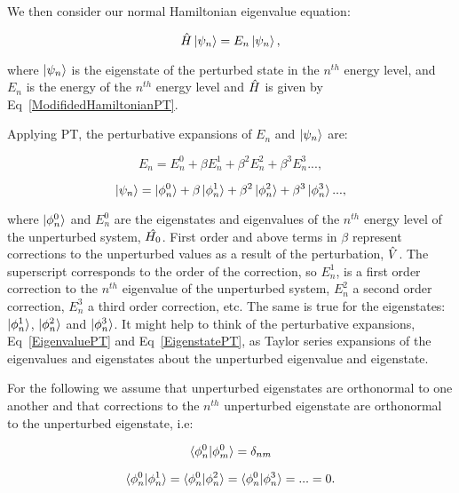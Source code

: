 \noindent We then consider our normal Hamiltonian eigenvalue equation:

\begin{equation}
    \Hat{H} \ket{\psi_n} = E_n \ket{\psi_n},
\end{equation}

\noindent where $\ket{\psi_n}$ is the eigenstate of the perturbed state in the $n^{th}$ energy level, and $E_n$ is the energy of the $n^{th}$ energy level and $\Hat{H}$ is given by Eq~\ref{ModifidedHamiltonianPT}.

\noindent Applying PT, the perturbative expansions of $E_n$ and $\ket{\psi_n}$ are:

\begin{equation}
    E_n = E^0_n + \beta E^1_n + \beta^2 E^2_n + \beta^3 E^3_n...,
    \label{EigenvaluePT}
\end{equation}

\begin{equation}
    \ket{\psi_n} = \ket{\phi^0_n} + \beta \ket{\phi^1_n} + \beta^2 \ket{\phi^2_n} + \beta^3 \ket{\phi^3_n}... ,
    \label{EigenstatePT}
\end{equation}

\noindent where $\ket{\phi^0_n}$ and $E^0_n$ are the eigenstates and eigenvalues of the $n^{th}$ energy level of the unperturbed system, $\Hat{H_0}$. First order and above terms in $\beta$ represent corrections to the unperturbed values as a result of the perturbation, $\Hat{V}$. The superscript corresponds to the order of the correction, so $E^1_n$, is a first order correction to the $n^{th}$ eigenvalue of the unperturbed system, $E^2_n$ a second order correction, $E^3_n$ a third order correction, etc. The same is true for the eigenstates: $\ket{\phi^1_n}$, $\ket{\phi^2_n}$ and $\ket{\phi^3_n}$. 
It might help to think of the perturbative expansions, Eq~\ref{EigenvaluePT} and Eq~\ref{EigenstatePT}, as Taylor series expansions of the eigenvalues and eigenstates about the unperturbed eigenvalue and eigenstate.

\noindent For the following we assume that unperturbed eigenstates are orthonormal to one another and that corrections to the $n^{th}$ unperturbed eigenstate are orthonormal to the unperturbed eigenstate, i.e:

\begin{equation}
    \braket{\phi^0_n | \phi^0_m} = \delta_{nm}
    \label{UnperturbedEigenstateOrthonormality}
\end{equation}

\begin{equation}
    \braket{\phi^0_n | \phi^1_n} = \braket{\phi^0_n | \phi^2_n} = \braket{\phi^0_n | \phi^3_n} = ... = 0.
    \label{EigenstateCorrectionsOrthogonal}
\end{equation}

